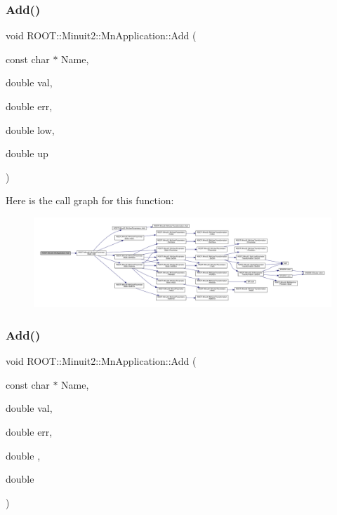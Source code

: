 \mbox{\label{classROOT_1_1Minuit2_1_1MnApplication_afd0879fb1f21d49dd649698c1cd25e50}} 
\subsubsection{\texorpdfstring{Add()}{Add()}\hspace{0.1cm}{\footnotesize\ttfamily [3/6]}}
{\footnotesize\ttfamily void R\+O\+O\+T\+::\+Minuit2\+::\+Mn\+Application\+::\+Add (\begin{DoxyParamCaption}\item[{const char $\ast$}]{Name,  }\item[{double}]{val,  }\item[{double}]{err,  }\item[{double}]{low,  }\item[{double}]{up }\end{DoxyParamCaption})}

Here is the call graph for this function\+:\nopagebreak
\begin{figure}[H]
\begin{center}
\leavevmode
\includegraphics[width=350pt]{df/dd5/classROOT_1_1Minuit2_1_1MnApplication_afd0879fb1f21d49dd649698c1cd25e50_cgraph}
\end{center}
\end{figure}
\mbox{\label{classROOT_1_1Minuit2_1_1MnApplication_afd0879fb1f21d49dd649698c1cd25e50}} 
\subsubsection{\texorpdfstring{Add()}{Add()}\hspace{0.1cm}{\footnotesize\ttfamily [4/6]}}
{\footnotesize\ttfamily void R\+O\+O\+T\+::\+Minuit2\+::\+Mn\+Application\+::\+Add (\begin{DoxyParamCaption}\item[{const char $\ast$}]{Name,  }\item[{double}]{val,  }\item[{double}]{err,  }\item[{double}]{,  }\item[{double}]{ }\end{DoxyParamCaption})}

